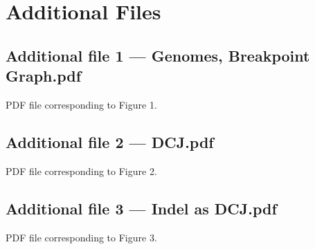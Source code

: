 \section*{Additional Files}
  \subsection*{Additional file 1 --- Genomes, Breakpoint Graph.pdf}
    PDF file corresponding to Figure 1.

  \subsection*{Additional file 2 --- DCJ.pdf}
    PDF file corresponding to Figure 2.
   
   \subsection*{Additional file 3 --- Indel as DCJ.pdf}
    PDF file corresponding to Figure 3.

